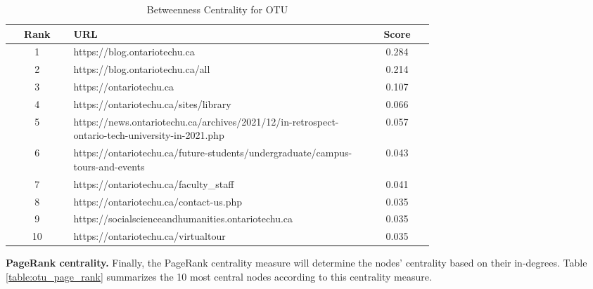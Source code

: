 \begin{table}
    \centering
    \begin{tabular}{|c|p{0.7\linewidth}|c|}
        \hline
        \textbf{Rank} & \textbf{URL} & \textbf{Score} \\
        \hline
        1 & https://blog.ontariotechu.ca & 0.284 \\ \hline
        2 & https://blog.ontariotechu.ca/all & 0.214 \\ \hline
        3 & https://ontariotechu.ca & 0.107 \\ \hline
        4 & https://ontariotechu.ca/sites/library & 0.066 \\ \hline
        5 & https://news.ontariotechu.ca/archives/2021/12/in-retrospect-ontario-tech-university-in-2021.php & 0.057 \\ \hline
        6 & https://ontariotechu.ca/future-students/undergraduate/campus-tours-and-events & 0.043 \\ \hline
        7 & https://ontariotechu.ca/faculty\_staff & 0.041 \\ \hline
        8 & https://ontariotechu.ca/contact-us.php & 0.035 \\ \hline
        9 & https://socialscienceandhumanities.ontariotechu.ca & 0.035 \\ \hline
        10 & https://ontariotechu.ca/virtualtour & 0.035 \\ \hline
    \end{tabular}
    \caption{Betweenness Centrality for OTU}
    \label{table:otu_betweenness}
\end{table}

\textbf{PageRank centrality.} Finally, the PageRank \cite{pagerankcitation} centrality measure will determine the nodes' centrality based on their in-degrees. Table \ref{table:otu_page_rank} summarizes the 10 most central nodes according to this centrality measure.


